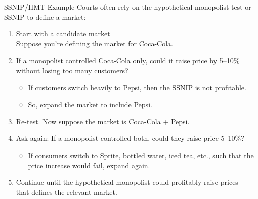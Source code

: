 \documentclass[aspectratio=169,10pt]{beamer}
\begin{document}
\begin{frame}{SSNIP/HMT Example}
Courts often rely on the \alert{hypothetical monopolist test} or \alert{SSNIP} to define a market:
\begin{enumerate}
\item Start with a candidate market\\
Suppose you’re defining the market for Coca-Cola.

\item  If a monopolist controlled Coca-Cola only, could it raise price by 5–10\% without losing too many customers?
\begin{itemize}
\item If customers switch heavily to Pepsi, then the SSNIP is not profitable.
\item So, expand the market to include Pepsi.
\end{itemize}
\item Re-test. Now suppose the market is Coca-Cola + Pepsi.
\item Ask again: If a monopolist controlled both, could they raise price 5–10\%?
\begin{itemize}
\item If consumers switch to Sprite, bottled water, iced tea, etc., such that the price increase would fail, expand again.
\end{itemize}
\item Continue until the hypothetical monopolist could profitably raise prices — that defines the relevant market.
\end{enumerate}
\end{frame}
\end{document}
